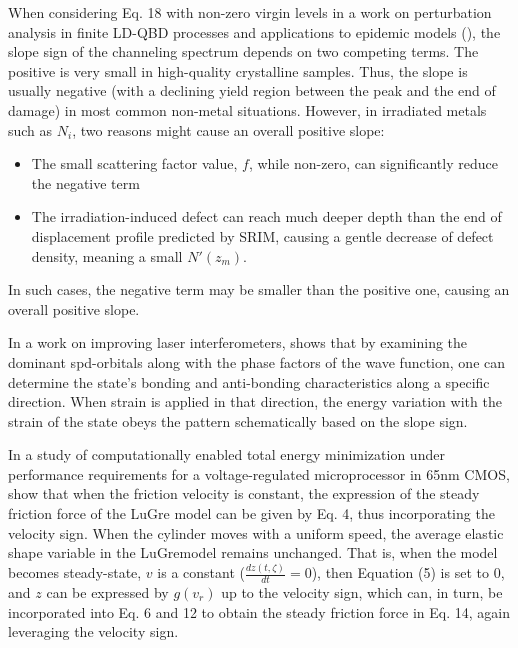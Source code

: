 \documentclass[11pt]{book}
\begin{document}
When considering Eq. 18 with non-zero
virgin levels in a work on perturbation analysis in finite LD-QBD
processes and applications to epidemic models (\cite{jin2019channeling}), the slope sign of the channeling spectrum depends on
two competing terms. The positive is very small in high-quality crystalline
samples. Thus, the slope is usually negative (with a declining yield
region between the peak and the end of damage) in most common non-metal
situations. However, in irradiated metals such as $N_{i}$, two reasons
might cause an overall positive slope:
\begin{itemize}
\item The small scattering factor value, $f$, while non-zero, can significantly
reduce the negative term
\item The irradiation-induced defect can reach much deeper depth than the
end of displacement profile predicted by SRIM, causing a gentle decrease
of defect density, meaning a small $N'\left(z_{m}\right)$.
\end{itemize}

In such cases, the negative term may be smaller than the positive one, causing
an overall positive slope.

In a work on improving laser interferometers, \cite{wei2020auxetic} shows that by examining the dominant spd-orbitals along with the phase factors of
the wave function, one can determine the
state's bonding and anti-bonding characteristics along a specific
direction. When strain is applied in that direction, the energy variation
with the strain of the state obeys the pattern schematically based
on the slope sign.

In a study of computationally enabled total energy minimization under
performance requirements for a voltage-regulated microprocessor in
65nm CMOS, \cite{wu2020influence} show that when the friction velocity is constant,
the expression of the steady friction force of the LuGre model can
be given by Eq. 4, thus incorporating the velocity sign. When the
cylinder moves with a uniform speed, the average elastic shape variable
in the LuGremodel remains unchanged. That is, when the model becomes
steady-state, $v$ is a constant ($\frac{dz\left(t,\zeta\right)}{dt}=0$),
then Equation (5) is set to $0$, and $z$ can be expressed by $g\left(v_{r}\right)$
up to the velocity sign, which can, in turn, be incorporated into Eq.
6 and 12 to obtain the steady friction force in Eq. 14, again leveraging
the velocity sign.
\end{document}
